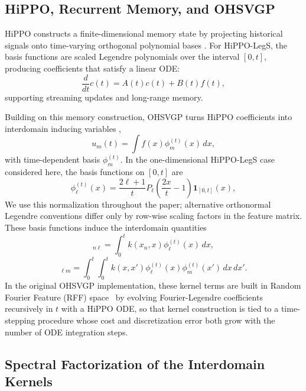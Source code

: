\documentclass{article}
\theoremstyle{plain}
\theoremstyle{definition}
\theoremstyle{remark}
\begin{document}
\subsection{HiPPO, Recurrent Memory, and OHSVGP}

HiPPO constructs a finite-dimensional memory state by projecting historical signals onto time-varying orthogonal polynomial bases \citep{Gu2020}. For HiPPO-LegS, the basis functions are scaled Legendre polynomials over the interval $[0,t]$, producing coefficients that satisfy a linear ODE:
\begin{equation}
\frac{d}{dt}c(t) = A(t)c(t) + B(t)f(t),
\end{equation}
supporting streaming updates and long-range memory.

Building on this memory construction, OHSVGP turns HiPPO coefficients into interdomain inducing variables \citep{Chen2025},
\begin{equation}
u_m(t)=\int f(x)\phi_m^{(t)}(x)\,dx,
\end{equation}
with time-dependent basis $\phi_m^{(t)}$. In the one-dimensional HiPPO-LegS case considered here, the basis functions on $[0,t]$ are
\begin{equation}
\phi_\ell^{(t)}(x) = \frac{2\ell+1}{t}P_\ell\!\left(\frac{2x}{t}-1\right)\mathbf{1}_{[0,t]}(x),
\end{equation}
We use this normalization throughout the paper; alternative orthonormal Legendre conventions differ only by row-wise scaling factors in the feature matrix.
These basis functions induce the interdomain quantities
\begin{equation}
[K_{fu}(t)]_{n\ell} = \int_0^t k(x_n,x)\phi_\ell^{(t)}(x)\,dx,
\end{equation}
\begin{equation}
[K_{uu}(t)]_{\ell m} = \int_0^t\int_0^t k(x,x')\phi_\ell^{(t)}(x)\phi_m^{(t)}(x')\,dx\,dx'.
\end{equation}
In the original OHSVGP implementation, these kernel terms are built in Random Fourier Feature (RFF) space~\citep{Rahimi2007,Hensman2018} by evolving Fourier-Legendre coefficients recursively in $t$ with a HiPPO ODE, so that kernel construction is tied to a time-stepping procedure whose cost and discretization error both grow with the number of ODE integration steps.

\subsection{Spectral Factorization of the Interdomain Kernels}
\label{sec:bochner}
\end{document}

